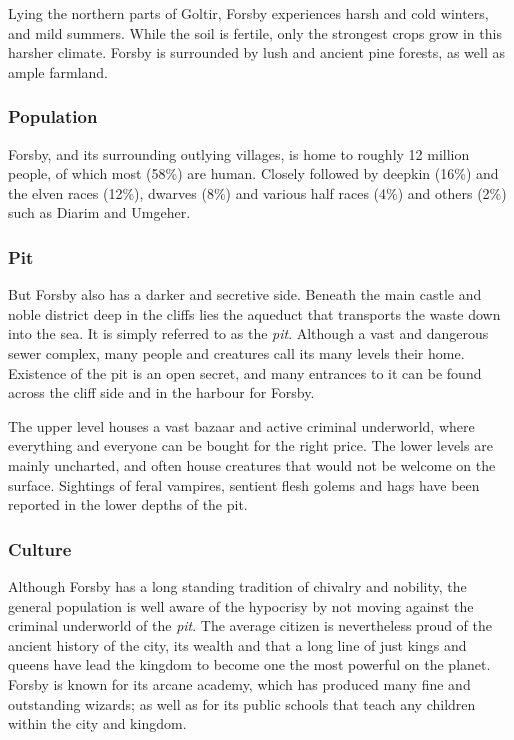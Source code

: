 Lying the northern parts of Goltir, Forsby experiences harsh and cold winters,
and mild summers. While the soil is fertile, only the strongest crops grow in
this harsher climate. Forsby is surrounded by lush and ancient pine forests,
as well as ample farmland.

\subsubsection{Population}

Forsby, and its surrounding outlying villages, is home to roughly 12 million
people, of which most (58\%) are human. Closely followed by deepkin (16\%)
and the elven races (12\%), dwarves (8\%) and various half races (4\%) and
others (2\%) such as Diarim and Umgeher.

\subsubsection{Pit}
\label{sec:Pit}

But Forsby also has a darker and secretive side. Beneath the main castle and
noble district deep in the cliffs lies the aqueduct that transports the waste
down into the sea. It is simply referred to as the \emph{pit}.  Although a
vast and dangerous sewer complex, many people and creatures call its many
levels their home. Existence of the pit is an open secret, and many entrances
to it can be found across the cliff side and in the harbour for Forsby.

The upper level houses a vast bazaar and active criminal underworld, where
everything and everyone can be bought for the right price. The lower levels
are mainly uncharted, and often house creatures that would not be welcome on
the surface. Sightings of feral vampires, sentient flesh golems and hags have
been reported in the lower depths of the pit.

\subsubsection{Culture}

Although Forsby has a long standing tradition of chivalry and nobility, the
general population is well aware of the hypocrisy by not moving against the
criminal underworld of the \emph{pit}. The average citizen is nevertheless
proud of the ancient history of the city, its wealth and that a long line of
just kings and queens have lead the kingdom to become one the most powerful on
the planet. Forsby is known for its arcane academy, which has produced many
fine and outstanding wizards; as well as for its public schools that teach any
children within the city and kingdom.

